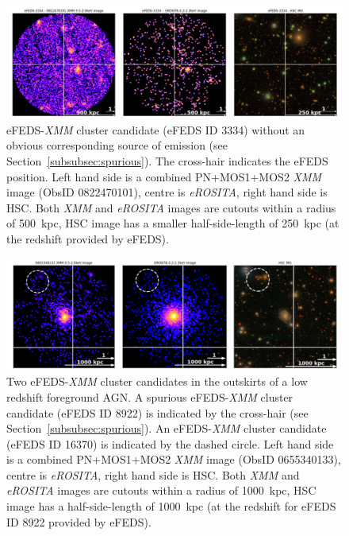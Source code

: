 \documentclass[fleqn,usenatbib]{mnras}
\begin{document}
\begin{figure}
    \centering
    \includegraphics[width=1\textwidth]{images/blank_lowz_hsc.png}
    \caption[]{eFEDS-{\em XMM} cluster candidate (eFEDS ID 3334) without an obvious corresponding source of emission (see Section~\ref{subsubsec:spurious}). The cross-hair indicates the eFEDS position. Left hand side is a combined PN+MOS1+MOS2 {\em XMM} image (ObsID 0822470101), centre is {\em eROSITA}, right hand side is HSC. Both {\em XMM} and {\em eROSITA} images are cutouts within a radius of 500~kpc, HSC image has a smaller half-side-length of 250~kpc (at the redshift provided by eFEDS).}
    \label{fig:blanksky}
\end{figure}

\begin{figure}
    \centering
    \includegraphics[width=1\textwidth]{images/outskirt_cands_hsc.png}
    \caption[]{Two eFEDS-{\em XMM} cluster candidates in the outskirts of a low redshift foreground AGN. A spurious eFEDS-{\em XMM} cluster candidate (eFEDS ID 8922) is indicated by the cross-hair (see Section~\ref{subsubsec:spurious}). An eFEDS-{\em XMM} cluster candidate (eFEDS ID 16370) is indicated by the dashed circle. Left hand side is a combined PN+MOS1+MOS2 {\em XMM} image (ObsID 0655340133), centre is {\em eROSITA}, right hand side is HSC. Both {\em XMM} and {\em eROSITA} images are cutouts within a radius of 1000~kpc, HSC image has a half-side-length of 1000~kpc (at the redshift for eFEDS ID 8922 provided by eFEDS).}
    \label{fig:brightoutskirts}
\end{figure}
\end{document}
